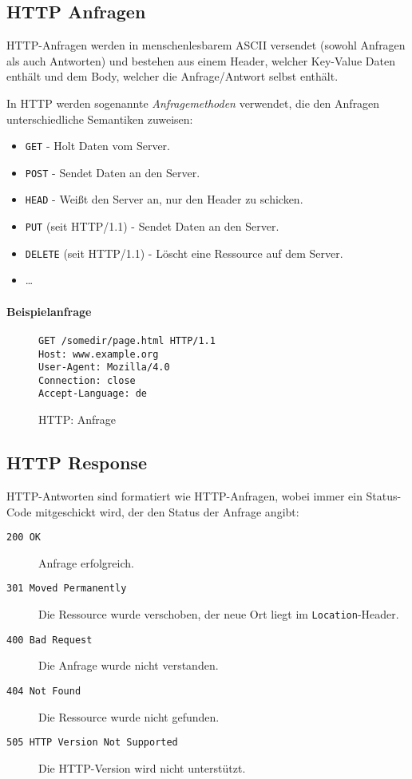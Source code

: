 		\subsection{HTTP Anfragen}
			HTTP-Anfragen werden in menschenlesbarem ASCII versendet (sowohl Anfragen als auch Antworten) und bestehen aus einem Header, welcher Key-Value Daten enthält und dem Body, welcher die Anfrage/Antwort selbst enthält.

			In HTTP werden sogenannte \textit{Anfragemethoden} verwendet, die den Anfragen unterschiedliche Semantiken zuweisen:
			\begin{itemize}
				\item \texttt{GET} - Holt Daten vom Server.
				\item \texttt{POST} - Sendet Daten an den Server.
				\item \texttt{HEAD} - Weißt den Server an, nur den Header zu schicken.
				\item \texttt{PUT} (seit HTTP/1.1) - Sendet Daten an den Server.
				\item \texttt{DELETE} (seit HTTP/1.1) - Löscht eine Ressource auf dem Server.
				\item \dots
			\end{itemize}

			\paragraph{Beispielanfrage}
				\begin{figure}[H]
					\centering
					\begin{lstlisting}
GET /somedir/page.html HTTP/1.1
Host: www.example.org
User-Agent: Mozilla/4.0
Connection: close
Accept-Language: de
                	\end{lstlisting}
					\caption{HTTP: Anfrage}
				\end{figure}

		\subsection{HTTP Response}
			HTTP-Antworten sind formatiert wie HTTP-Anfragen, wobei immer ein Status-Code mitgeschickt wird, der den Status der Anfrage angibt:
			\begin{description}
				\item[\texttt{200 OK}] Anfrage erfolgreich.
				\item[\texttt{301 Moved Permanently}] Die Ressource wurde verschoben, der neue Ort liegt im \texttt{Location}-Header.
				\item[\texttt{400 Bad Request}] Die Anfrage wurde nicht verstanden.
				\item[\texttt{404 Not Found}] Die Ressource wurde nicht gefunden.
				\item[\texttt{505 HTTP Version Not Supported}] Die HTTP-Version wird nicht unterstützt.
			\end{description}

